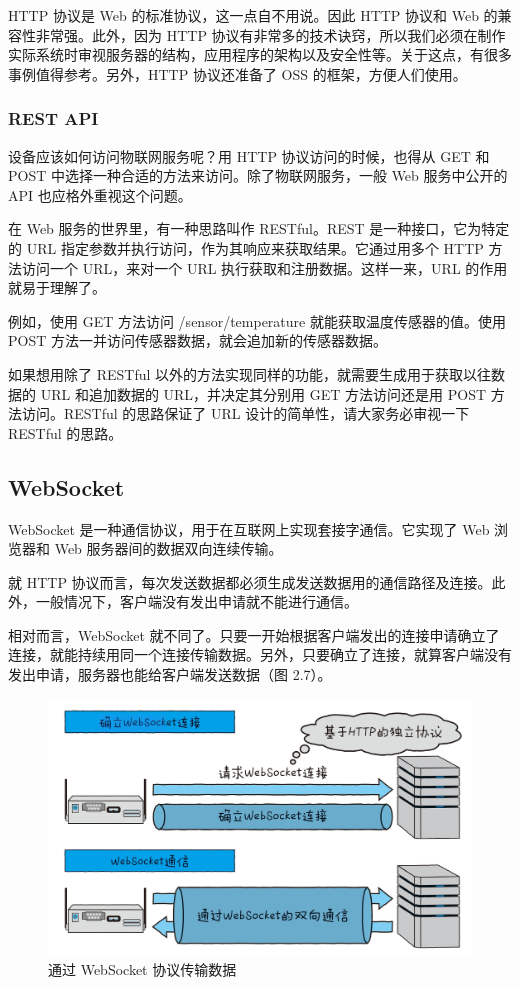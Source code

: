 \documentclass[12pt,UTF8]{ctexbook}
\begin{document}
HTTP 协议是 Web 的标准协议，这一点自不用说。因此 HTTP 协议和 Web 的兼容性非常强。此外，因为 HTTP 协议有非常多的技术诀窍，所以我们必须在制作实际系统时审视服务器的结构，应用程序的架构以及安全性等。关于这点，有很多事例值得参考。另外，HTTP 协议还准备了 OSS 的框架，方便人们使用。

\subsubsection{REST API}

设备应该如何访问物联网服务呢？用 HTTP 协议访问的时候，也得从 GET 和 POST 中选择一种合适的方法来访问。除了物联网服务，一般 Web 服务中公开的 API 也应格外重视这个问题。

在 Web 服务的世界里，有一种思路叫作 RESTful。REST 是一种接口，它为特定的 URL 指定参数并执行访问，作为其响应来获取结果。它通过用多个 HTTP 方法访问一个 URL，来对一个 URL 执行获取和注册数据。这样一来，URL 的作用就易于理解了。

例如，使用 GET 方法访问 /sensor/temperature 就能获取温度传感器的值。使用 POST 方法一并访问传感器数据，就会追加新的传感器数据。

如果想用除了 RESTful 以外的方法实现同样的功能，就需要生成用于获取以往数据的 URL 和追加数据的 URL，并决定其分别用 GET 方法访问还是用 POST 方法访问。RESTful 的思路保证了 URL 设计的简单性，请大家务必审视一下 RESTful 的思路。

\subsection{WebSocket}

WebSocket 是一种通信协议，用于在互联网上实现套接字通信。它实现了 Web 浏览器和 Web 服务器间的数据双向连续传输。

就 HTTP 协议而言，每次发送数据都必须生成发送数据用的通信路径及连接。此外，一般情况下，客户端没有发出申请就不能进行通信。

相对而言，WebSocket 就不同了。只要一开始根据客户端发出的连接申请确立了连接，就能持续用同一个连接传输数据。另外，只要确立了连接，就算客户端没有发出申请，服务器也能给客户端发送数据（图
2.7）。

\begin{figure}[htbp]
	\centering
	\includegraphics[width=1\linewidth]{26}
	\caption{通过 WebSocket 协议传输数据}
	\label{fig:1}
\end{figure}
\end{document}

